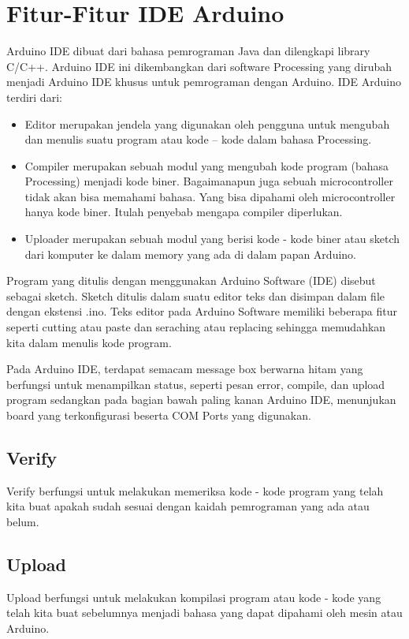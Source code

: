 \section{Fitur-Fitur IDE Arduino}

Arduino IDE dibuat dari bahasa pemrograman Java dan dilengkapi library C/C++.  Arduino IDE ini dikembangkan dari software Processing yang dirubah menjadi Arduino IDE khusus untuk pemrograman dengan Arduino. IDE Arduino terdiri dari:

\begin{itemize}

\item Editor merupakan  jendela yang digunakan oleh pengguna untuk mengubah dan menulis suatu program atau kode – kode dalam bahasa Processing.
\item Compiler merupakan sebuah modul yang mengubah kode program (bahasa Processing) menjadi kode biner. Bagaimanapun juga sebuah microcontroller tidak akan bisa memahami bahasa. Yang bisa dipahami oleh microcontroller hanya kode biner. Itulah penyebab mengapa compiler diperlukan.
\item Uploader merupakan sebuah modul yang berisi kode - kode biner atau sketch dari komputer ke dalam memory yang ada di dalam papan Arduino.
 
\end{itemize}
 
Program yang ditulis dengan menggunakan Arduino Software (IDE) disebut sebagai sketch. Sketch ditulis dalam suatu editor teks dan disimpan dalam file dengan ekstensi .ino. Teks editor pada Arduino Software memiliki beberapa fitur seperti cutting atau paste dan seraching atau replacing sehingga memudahkan kita dalam menulis kode program.

Pada Arduino IDE, terdapat semacam message box berwarna hitam yang berfungsi untuk menampilkan status, seperti pesan error, compile, dan upload program sedangkan pada bagian bawah paling kanan Arduino IDE, menunjukan board yang terkonfigurasi beserta COM Ports yang digunakan.

\subsection{Verify}
Verify berfungsi untuk melakukan memeriksa kode - kode program yang telah kita buat apakah sudah sesuai dengan kaidah pemrograman yang ada atau belum.
\subsection{Upload}
Upload berfungsi untuk melakukan kompilasi program atau kode - kode yang telah kita buat sebelumnya menjadi bahasa yang dapat dipahami oleh mesin atau Arduino.
